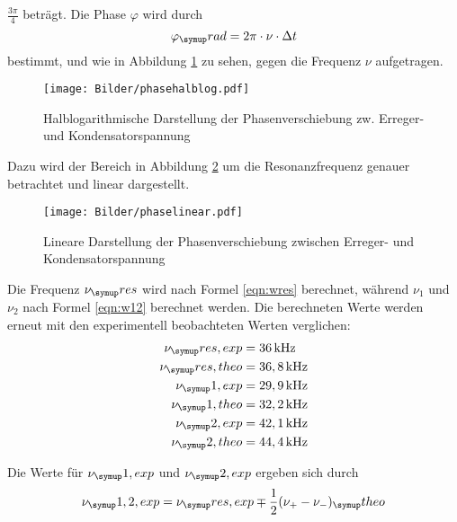 $\frac{3\pi}{4}$ beträgt. Die Phase $\varphi$ wird durch
\begin{equation}
  \varphi_\su{rad} = 2\pi \cdot \nu \cdot \Delta t
\end{equation}
bestimmt, und wie in Abbildung \ref{fig:philog}
zu sehen, gegen die Frequenz $\nu$ aufgetragen.
\newpage
\begin{figure}[!h]
  \centering
  \texttt{[image: Bilder/phasehalblog.pdf]}
  \caption{Halblogarithmische Darstellung der Phasenverschiebung zw. Erreger-
  und Kondensatorspannung}
  \label{fig:philog}
\end{figure}
Dazu wird der Bereich in Abbildung \ref{fig:phse} um die Resonanzfrequenz genauer
betrachtet und linear dargestellt.

\begin{figure}[!h]
  \centering
  \texttt{[image: Bilder/phaselinear.pdf]}
  \caption{Lineare Darstellung der Phasenverschiebung zwischen Erreger- und
  Kondensatorspannung}
  \label{fig:phse}
\end{figure}
Die Frequenz $\nu_\su{res}$ wird nach Formel \eqref{eqn:wres} berechnet,
während $\nu_1$ und $\nu_2$ nach Formel \eqref{eqn:w12} berechnet werden.
Die berechneten Werte werden erneut mit den experimentell beobachteten Werten
verglichen:
\begin{align*}
  \nu_\su{res,exp} &= 36\kHz \\
  \nu_\su{res,theo}&= 36,8 \kHz \\
  \nu_\su{1,exp} &= 29,9\kHz \\
  \nu_\su{1,theo}&=32,2\kHz \\
  \nu_\su{2,exp} &= 42,1 \kHz \\
  \nu_\su{2,theo}&= 44,4\kHz
\end{align*}

Die Werte für $\nu_\su{1,exp}$ und $\nu_\su{2,exp}$ ergeben sich durch
\begin{equation*}
  \nu_\su{1, 2, exp} = \nu_\su{res,exp} \mp \frac{1}{2}(\nu_+ - \nu_-)_\su{theo}
\end{equation*}
